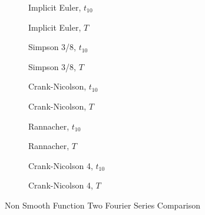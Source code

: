 \documentclass[00main.tex]{subfiles}
\begin{document}
\begin{figure}
\centering
\begin{subfigure}[b]{0.3\textwidth}
\resizebox{1\textwidth}{!}{
}
\caption{Implicit Euler, $t_{10}$}
\label{comp2f_IE_t10}
\end{subfigure}%
\begin{subfigure}[b]{0.3\textwidth}
\resizebox{1\textwidth}{!}{
}
\caption{Implicit Euler, $T$}
\label{comp2f_IE_T}
\end{subfigure}%

\begin{subfigure}[b]{0.3\textwidth}
\resizebox{1\textwidth}{!}{
}
\caption{Simpson 3/8, $t_{10}$}
\label{fig:tiger}
\end{subfigure}
\begin{subfigure}[b]{0.3\textwidth}
\resizebox{1\textwidth}{!}{
}
\caption{Simpson 3/8, $T$}
\label{fig:tiger}
\end{subfigure}

\begin{subfigure}[b]{0.3\textwidth}
\resizebox{1\textwidth}{!}{
}
\caption{Crank-Nicolson, $t_{10}$}
\label{fig:tiger}
\end{subfigure}
\begin{subfigure}[b]{0.3\textwidth}
\resizebox{1\textwidth}{!}{
}
\caption{Crank-Nicolson, $T$}
\label{fig:tiger}
\end{subfigure}

\begin{subfigure}[b]{0.3\textwidth}
\resizebox{1\textwidth}{!}{
}
\caption{Rannacher, $t_{10}$}
\label{comp2f_R_t10}
\end{subfigure}
\begin{subfigure}[b]{0.3\textwidth}
\resizebox{1\textwidth}{!}{
}
\caption{Rannacher, $T$}
\label{comp2f_R_T}
\end{subfigure}

\begin{subfigure}[b]{0.3\textwidth}
\resizebox{1\textwidth}{!}{
}
\caption{Crank-Nicolson 4, $t_{10}$}
\label{fig:tiger}
\end{subfigure}
\begin{subfigure}[b]{0.3\textwidth}
\resizebox{1\textwidth}{!}{
}
\caption{Crank-Nicolson 4, $T$}
\label{fig:tiger}
\end{subfigure}
\caption{Non Smooth Function Two Fourier Series Comparison}
\label{comp2f}
\end{figure}
\end{document}
